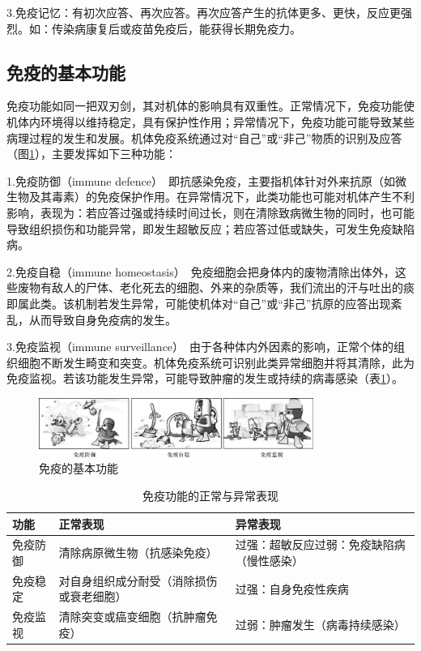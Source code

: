 3.免疫记忆：有初次应答、再次应答。再次应答产生的抗体更多、更快，反应更强烈。如：传染病康复后或疫苗免疫后，能获得长期免疫力。


\subsection{免疫的基本功能}

免疫功能如同一把双刃剑，其对机体的影响具有双重性。正常情况下，免疫功能使机体内环境得以维持稳定，具有保护性作用；异常情况下，免疫功能可能导致某些病理过程的发生和发展。机体免疫系统通过对“自己”或“非己”物质的识别及应答（图\ref{fig1-1}），主要发挥如下三种功能：

1.免疫防御（immune
defence）　即抗感染免疫，主要指机体针对外来抗原（如微生物及其毒素）的免疫保护作用。在异常情况下，此类功能也可能对机体产生不利影响，表现为：若应答过强或持续时间过长，则在清除致病微生物的同时，也可能导致组织损伤和功能异常，即发生超敏反应；若应答过低或缺失，可发生免疫缺陷病。

2.免疫自稳（immune
homeostasis）　免疫细胞会把身体内的废物清除出体外，这些废物有敌人的尸体、老化死去的细胞、外来的杂质等，我们流出的汗与吐出的痰即属此类。该机制若发生异常，可能使机体对“自己”或“非己”抗原的应答出现紊乱，从而导致自身免疫病的发生。

3.免疫监视（immune
surveillance）　由于各种体内外因素的影响，正常个体的组织细胞不断发生畸变和突变。机体免疫系统可识别此类异常细胞并将其清除，此为免疫监视。若该功能发生异常，可能导致肿瘤的发生或持续的病毒感染（表\ref{tab1-1}）。

\begin{figure}[!htbp]
 \centering
 \includegraphics[width=0.8\textwidth]{./images/Image00008.jpg}
 \caption{免疫的基本功能}
 \label{fig1-1}
  \end{figure} 

\begin{longtable}[]{@{}lll@{}}
\caption{免疫功能的正常与异常表现}
\label{tab1-1}\\
\toprule
功能 & 正常表现 & 异常表现\tabularnewline
\midrule
\endhead
免疫防御 & 清除病原微生物（抗感染免疫） &
过强：超敏反应过弱：免疫缺陷病（慢性感染）\tabularnewline
免疫稳定 & 对自身组织成分耐受（消除损伤或衰老细胞） &
过强：自身免疫性疾病\tabularnewline
免疫监视 & 清除突变或癌变细胞（抗肿瘤免疫） &
过弱：肿瘤发生（病毒持续感染）\tabularnewline
\bottomrule
\end{longtable}


